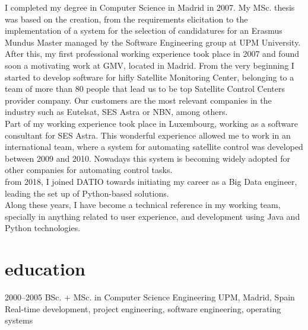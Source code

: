 \documentclass[]{friggeri-cv}
\begin{document}
{\headingfont I completed my degree} in Computer Science in Madrid in 2007. My MSc. thesis was based on 
the creation, from the requirements elicitation to the implementation of a system for the selection of candidatures for an
Erasmus Mundus Master managed by the Software Engineering group at UPM University. \\
{\headingfont After this, my first professional working experience} took place in 2007 and found soon a motivating work 
at GMV, located in Madrid. From the very beginning I started to develop software for hifly Satellite Monitoring Center,
belonging to a team of more than 80 people that lead us to be top Satellite Control Centers provider company. 
Our customers are the most relevant companies in the industry such as Eutelsat, SES Astra or NBN, among others. \\
{\headingfont Part of my working experience took place in Luxembourg,} working as a software consultant for SES Astra.
This wonderful experience allowed me to work in an international team, where a system for automating satellite control
was developed between 2009 and 2010. Nowadays this system is becoming widely adopted for other companies for automating
control tasks. \\
{\headingfont from 2018, I joined DATIO towards initiating my career as a Big Data engineer}, leading the set up of Python-based
solutions. \\
{\headingfont Along these years,} I have become a technical reference in my working team, specially in anything related
to user experience, and development using Java and Python technologies. \\


\section{education}

\begin{entrylist}
\entry
{2000--2005}
{BSc. + MSc. {\normalfont in Computer Science Engineering}}
{UPM, Madrid, Spain}
{Real-time development, project engineering, software engineering, operating systems}
\end{entrylist}
\end{document}
